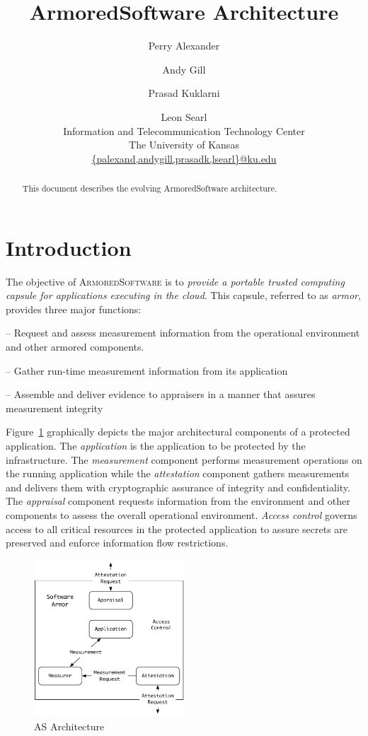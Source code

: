 \documentclass[10pt]{article}
\title{ArmoredSoftware Architecture}
\author{Perry Alexander \and Andy Gill \and Prasad Kuklarni \and Leon
  Searl \\
Information and Telecommunication Technology Center \\
The University of Kansas \\
\url{{palexand,andygill,prasadk,lsearl}@ku.edu}}
\begin{document}
\maketitle
\tableofcontents
\listoffigures
\listoftables

\begin{abstract}
  This document describes the evolving ArmoredSoftware architecture.
\end{abstract}

\section{Introduction}

The objective of \textsc{ArmoredSoftware} is to \emph{provide a portable
trusted computing capsule for applications executing in the cloud}.
This capsule, referred to as \emph{armor}, provides three major
functions:

\begin{description}
  \parskip=0pt\itemsep=0pt
\item[Appraisal] -- Request and assess measurement information from
  the operational environment and other armored components.
\item[Measurement] -- Gather run-time measurement information from its
  application
\item[Attestation] -- Assemble and deliver evidence to appraisers in a
  manner that assures measurement integrity
\end{description}

Figure~\ref{fig:architecture} graphically depicts the major
architectural components of a protected application.  The
\emph{application} is the application to be protected by the
infrastructure.  The \emph{measurement} component performs measurement
operations on the running application while the \emph{attestation}
component gathers measurements and delivers them with cryptographic
assurance of integrity and confidentiality.  The \emph{appraisal}
component requests information from the environment and other
components to assess the overall operational environment.
\emph{Access control} governs access to all critical resources in the
protected application to assure secrets are preserved and enforce
information flow restrictions.

\begin{figure}
  \centering
  \includegraphics[width=0.5\textwidth]{figures/architecture.pdf}
  \caption{AS Architecture}
  \label{fig:architecture}
\end{figure}
\end{document}
